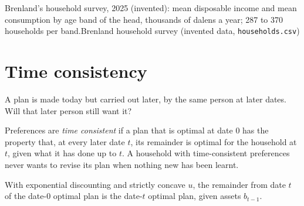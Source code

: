 \begin{omchart}{Brenland's household survey, 2025 (invented): mean disposable income and mean
  consumption by age band of the head, thousands of dalens a year; 287 to 370 households per band.}{Brenland
  household survey (invented data, \texttt{households.csv})}
\end{omchart}

\section{Time consistency}\label{sec:b2:intertemporal-choice:consistency}

A plan is made today but carried out later, by the same person at later dates. Will that later person
still want it?

\begin{definition}\label{def:b2:intertemporal-choice:time-consistency}
Preferences are \emph{time consistent} if a plan that is optimal at date 0 has
the property that, at every later date $t$, its remainder is optimal for the household at $t$, given
what it has done up to $t$. A household with time-consistent preferences never wants to revise its
plan when nothing new has been learnt.
\end{definition}

\begin{proposition}\label{prop:b2:intertemporal-choice:consistent}
With exponential discounting and strictly concave $u$, the remainder from date $t$ of the date-0
optimal plan is the date-$t$ optimal plan, given assets $b_{t-1}$.
\end{proposition}

